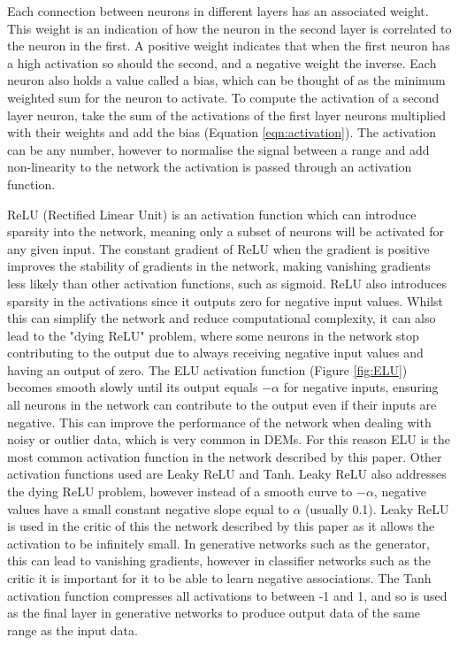 \documentclass[twocolumn]{article}
\begin{document}
Each connection between neurons in different layers has an associated weight.
This weight is an indication of how the neuron in the second layer is correlated to the neuron in the first.
A positive weight indicates that when the first neuron has a high activation so should the second, and a negative weight the inverse.
Each neuron also holds a value called a bias, which can be thought of as the minimum weighted sum for the neuron to activate.
To compute the activation of a second layer neuron, take the sum of the activations of the first layer neurons multiplied with their weights and add the bias (Equation \ref{eqn:activation}).
The activation can be any number, however to normalise the signal between a range and add non-linearity to the network the activation is passed through an activation function.

ReLU (Rectified Linear Unit) is an activation function which can introduce sparsity into the network, meaning only a subset of neurons will be activated for any given input.
The constant gradient of ReLU when the gradient is positive improves the stability of gradients in the network, making vanishing gradients less likely than other activation functions, such as sigmoid.
ReLU also introduces sparsity in the activations since it outputs zero for negative input values.
Whilst this can simplify the network and reduce computational complexity, it can also lead to the "dying ReLU" problem, where some neurons in the network stop contributing to the output due to always receiving negative input values and having an output of zero.
The ELU activation function (Figure \ref{fig:ELU}) becomes smooth slowly until its output equals \(-\alpha\) for negative inputs, ensuring all neurons in the network can contribute to the output even if their inputs are negative.
This can improve the performance of the network when dealing with noisy or outlier data, which is very common in DEMs.
For this reason ELU is the most common activation function in the network described by this paper.
Other activation functions used are Leaky ReLU and Tanh.
Leaky ReLU also addresses the dying ReLU problem, however instead of a smooth curve to \(-\alpha\), negative values have a small constant negative slope equal to \(\alpha\) (usually 0.1).
Leaky ReLU is used in the critic of this the network described by this paper as it allows the activation to be infinitely small.
In generative networks such as the generator, this can lead to vanishing gradients, however in classifier networks such as the critic it is important for it to be able to learn negative associations.
The Tanh activation function compresses all activations to between -1 and 1, and so is used as the final layer in generative networks to produce output data of the same range as the input data.
\end{document}
